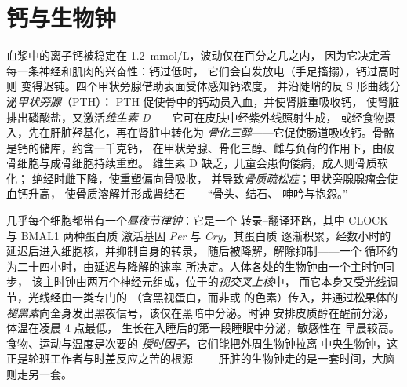 \section{钙与生物钟}

\begin{definition}[钙稳态]\label{def:b3:endocrinology:calcium}
血浆中的离子钙被稳定在 \qty{1.2}{mmol/L}，波动仅在百分之几之内，
因为它决定着每一条神经和肌肉的兴奋性：钙过低时，
它们会自发放电（手足搐搦），钙过高时则
变得迟钝。四个甲状旁腺借助表面受体感知钙浓度，
并沿陡峭的反 S 形曲线分泌\emph{甲状旁腺}（PTH）：
PTH 促使骨中的钙动员入血，并使肾脏重吸收钙，
使肾脏排出磷酸盐，又激活\emph{维生素 D}——它可在皮肤中经紫外线照射生成，
或经食物摄入，先在肝脏羟基化，再在肾脏中转化为
\emph{骨化三醇}——它促使肠道吸收钙。骨骼
是钙的储库，约含一千克钙，
在甲状旁腺、骨化三醇、雌与负荷的作用下，由破骨细胞与成骨细胞持续重塑。
维生素 D 缺乏，儿童会患佝偻病，成人则骨质软化；
绝经时雌下降，使重塑偏向骨吸收，
并导致\emph{骨质疏松症}；甲状旁腺腺瘤会使血钙升高，
使骨质溶解并形成肾结石——“骨头、结石、
呻吟与抱怨。”
\end{definition}

\begin{definition}[昼夜节律钟]\label{def:b3:endocrinology:clock}
几乎每个细胞都带有一个\emph{昼夜节律钟}：它是一个
转录–翻译环路，其中 CLOCK 与 BMAL1 两种蛋白质
激活基因 \emph{Per} 与 \emph{Cry}，其蛋白质
逐渐积累，经数小时的延迟后进入细胞核，并抑制自身的转录，
随后被降解，解除抑制——一个
循环约为二十四小时，由延迟与降解的速率
所决定。人体各处的生物钟由一个主时钟同步，
该主时钟由两万个神经元组成，位于的\emph{视交叉上核}中，
而它本身又受光线调节，光线经由一类专门的
（含黑视蛋白，而非或
的色素）传入，并通过松果体的
\emph{褪黑素}向全身发出黑夜信号，该仅在黑暗中分泌。时钟
安排皮质醇在醒前分泌，体温在凌晨 4 点最低，
生长在入睡后的第一段睡眠中分泌，敏感性在
早晨较高。食物、运动与温度是次要的
\emph{授时因子}，它们能把外周生物钟拉离
中央生物钟，这正是轮班工作者与时差反应之苦的根源——
肝脏的生物钟走的是一套时间，大脑则走另一套。
\end{definition}

